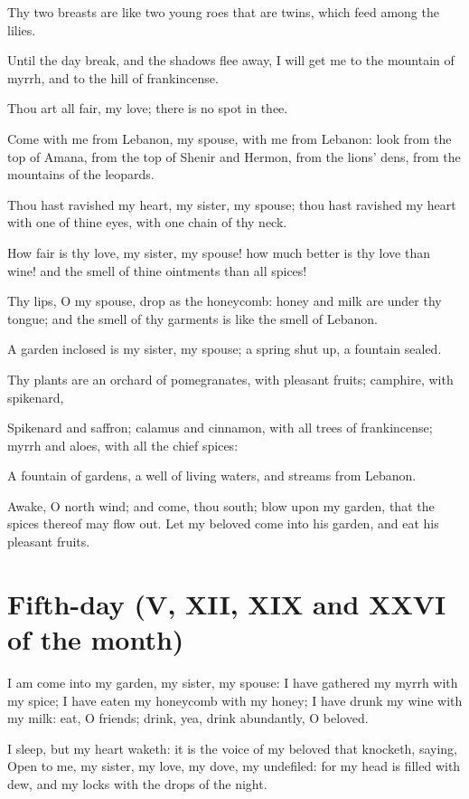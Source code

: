 \documentclass[0main.tex]{subfiles}
\begin{document}
Thy two breasts are like two young roes that are twins, which feed among the lilies.

Until the day break, and the shadows flee away, I will get me to the mountain of myrrh, and to the hill of frankincense.

Thou art all fair, my love; there is no spot in thee.

Come with me from Lebanon, my spouse, with me from Lebanon: look from the top of Amana, from the top of Shenir and Hermon, from the lions' dens, from the mountains of the leopards.

Thou hast ravished my heart, my sister, my spouse; thou hast ravished my heart with one of thine eyes, with one chain of thy neck.

How fair is thy love, my sister, my spouse! how much better is thy love than wine! and the smell of thine ointments than all spices!

Thy lips, O my spouse, drop as the honeycomb: honey and milk are under thy tongue; and the smell of thy garments is like the smell of Lebanon.

A garden inclosed is my sister, my spouse; a spring shut up, a fountain sealed.

Thy plants are an orchard of pomegranates, with pleasant fruits; camphire, with spikenard,

Spikenard and saffron; calamus and cinnamon, with all trees of frankincense; myrrh and aloes, with all the chief spices:

A fountain of gardens, a well of living waters, and streams from Lebanon.

Awake, O north wind; and come, thou south; blow upon my garden, that the spices thereof may flow out. Let my beloved come into his garden, and eat his pleasant fruits.

\section*{Fifth-day (V, XII, XIX and XXVI of the month)}

I am come into my garden, my sister, my spouse: I have gathered my myrrh with my spice; I have eaten my honeycomb with my honey; I have drunk my wine with my milk: eat, O friends; drink, yea, drink abundantly, O beloved.

I sleep, but my heart waketh: it is the voice of my beloved that knocketh, saying, Open to me, my sister, my love, my dove, my undefiled: for my head is filled with dew, and my locks with the drops of the night.
\end{document}
